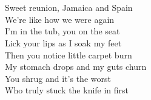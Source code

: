\\
 \\
Sweet reunion, Jamaica and Spain \\
We're like how we were again \\
I'm in the tub, you on the seat \\
Lick your lips as I soak my feet \\
Then you notice little carpet burn \\
My stomach drops and my guts churn \\
You shrug and it's the worst \\
Who truly stuck the knife in first \\
